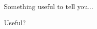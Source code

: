 \begin{tdocnote}
    Something useful to tell you...
\end{tdocnote}

\begin{tdocnote}
    Useful?
\end{tdocnote}
